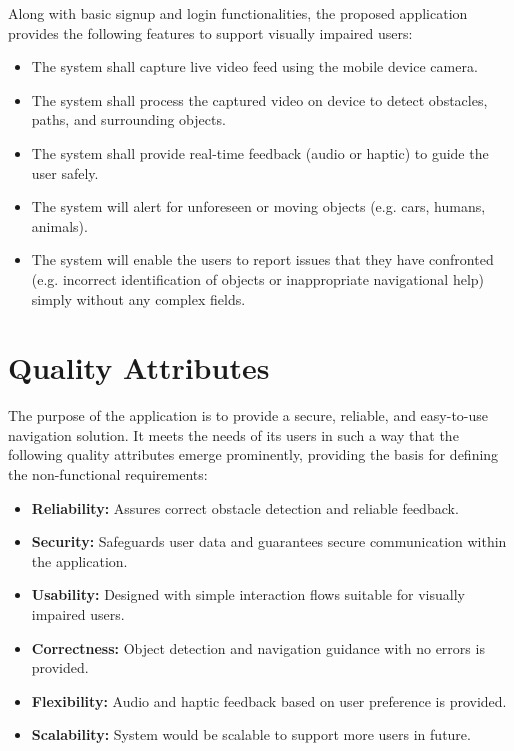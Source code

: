 \documentclass{FastFyp}
\begin{document}
Along with basic signup and login functionalities, the proposed application provides the following features to support visually impaired users:

\begin{itemize}
    \item The system shall capture live video feed using the mobile device camera.
    \item The system shall process the captured video on device to detect obstacles, paths, and surrounding objects.
    \item The system shall provide real-time feedback (audio or haptic) to guide the user safely.
    \item The system will alert for unforeseen or moving objects (e.g. cars, humans, animals).
    \item The system will enable the users to report issues that they have confronted (e.g. incorrect identification of objects or inappropriate navigational help) simply without any complex fields.
\end{itemize}
\section{Quality Attributes}
The purpose of the application is to provide a secure, reliable, and easy-to-use navigation solution. It meets the needs of its users in such a way that the following quality attributes emerge prominently, providing the basis for defining the non-functional requirements:

\begin{itemize}
    \item \textbf{Reliability:} Assures correct obstacle detection and reliable feedback.
    \item \textbf{Security:} Safeguards user data and guarantees secure communication within the application.
    \item \textbf{Usability:} Designed with simple interaction flows suitable for visually impaired users.
    \item \textbf{Correctness:} Object detection and navigation guidance with no errors is provided.
    \item \textbf{Flexibility:} Audio and haptic feedback based on user preference is provided.
    \item \textbf{Scalability:} System would be scalable to support more users in future.
\end{itemize}
\end{document}

